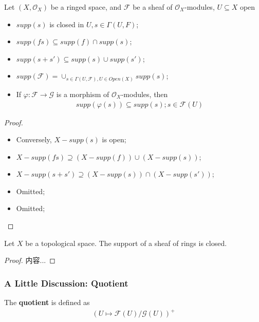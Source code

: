 \documentclass[Total.tex]{subfiles}
\begin{document}
			\begin{lemma}
				Let $(X,\mathcal{O}_X)$ be a ringed space, and $\mathcal{F}$ be a sheaf of $\mathcal{O}_X$-modules, $U\subseteq X$ open
				
				\begin{itemize}
					\item $supp(s)$ is closed in $U,s\in \Gamma(U,F)$;
					\item $supp(fs)\subseteq supp(f)\cap supp(s)$;
					\item $supp(s+s')\subseteq supp(s)\cup supp(s')$;
					\item $supp(\mathcal{F})=\cup_{s\in \Gamma(U,\mathcal{F}),U\in Open(X)} supp(s)$;
					\item If $\varphi:\mathcal{F}\rightarrow \mathcal{G}$ is a morphism of $\mathcal{O}_X$-modules, then
					\begin{gather*}
						supp(\varphi(s))\subseteq supp(s);s\in \mathcal{F}(U)
					\end{gather*}
				\end{itemize}
			\end{lemma}
			\begin{proof}
				\begin{itemize}
					\item Conversely, $X-supp(s)$ is open;
					\item $X-supp(fs)\supseteq (X-supp(f))\cup (X-supp(s))$;
					\item $X-supp(s+s')\supseteq (X-supp(s))\cap (X-supp(s'))$;
					\item Omitted;
					\item Omitted;
				\end{itemize}
			\end{proof}
			\begin{lemma}
				Let $X$ be a topological space. The support of a sheaf of rings is closed.
			\end{lemma}
			\begin{proof}
				内容...
			\end{proof}
			\subsubsection{A Little Discussion: Quotient}
			\begin{Def}
				The \textbf{quotient} is defined as
				\begin{gather*}
					(U\mapsto \mathcal{F}(U)/\mathcal{G}(U))^+
				\end{gather*}
			\end{Def}
			
\end{document}
